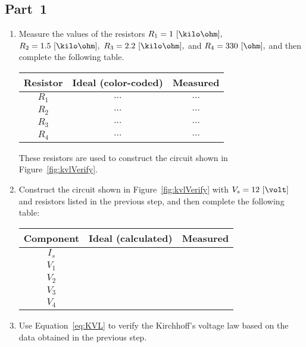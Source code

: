 \subsection{Part~1}
\label{sec:part1}

\begin{enumerate}
\item Measure the values of the resistors $R_1=1~[\kilo\ohm],$ $R_2=1.5~[\kilo\ohm],$ $R_3=2.2~[\kilo\ohm],$ and $R_4=330~[\ohm],$  and then complete the following table. 

  \begin{center}
    \begin{tabular}{c|c|c}
      \toprule
      Resistor &  Ideal (color-coded) & Measured\\
      \toprule
      $R_1$ & $\ldots$ & $\ldots$\\   %
      $R_2$ & $\ldots$ & $\ldots$\\   %
      $R_3$ & $\ldots$ & $\ldots$\\   %
      $R_4$ & $\ldots$ & $\ldots$\\   %
      \bottomrule
    \end{tabular}    
  \end{center}


  These resistors are used to construct the circuit shown in Figure~\ref{fig:kvlVerify}.
  
\item Construct the circuit shown in Figure~\ref{fig:kvlVerify} with $V_s=12~[\volt]$ and resistors listed in the previous step, and then  complete the following table:

  \begin{center}
  \begin{tabular}{|c|c|c|}
    \toprule
    Component & Ideal (calculated) & Measured\\
    \toprule
    $I_s$ & & \\                    %
    $V_1$ & & \\          %
    $V_2$ & & \\          %
    $V_3$ & & \\          %
    $V_4$ & & \\          %
    \bottomrule
  \end{tabular}      
  \end{center}


\item Use Equation~\eqref{eq:KVL} to verify the Kirchhoff's voltage law based on the data obtained in the previous step. 

 

  
\end{enumerate}

